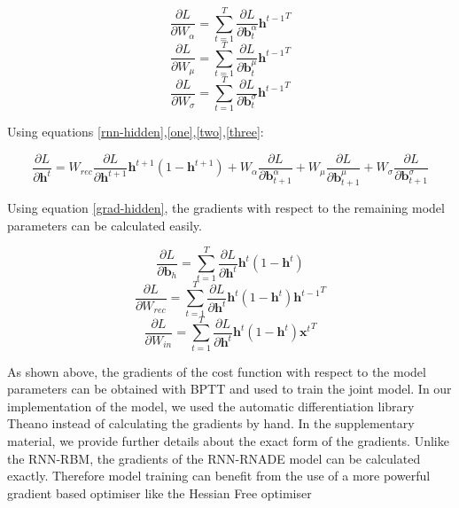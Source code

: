\documentclass{article} %
\begin{document}
\begin{equation}
\frac{\partial L}{\partial W_{\alpha}} = \sum_{t=1}^T \frac{\partial L}{\partial \mathbf{b}^{\alpha}_{t}} {\mathbf{h}^{t-1}}^{T}
\end{equation}
\begin{equation}
\frac{\partial L}{\partial W_{\mu}} = \sum_{t=1}^T \frac{\partial L}{\partial \mathbf{b}^{\mu}_{t}} {\mathbf{h}^{t-1}}^{T}
\end{equation}
\begin{equation}
\frac{\partial L}{\partial W_{\sigma}} = \sum_{t=1}^T \frac{\partial L}{\partial \mathbf{b}^{\sigma}_{t}} {\mathbf{h}^{t-1}}^{T}
\end{equation}

Using equations \ref{rnn-hidden},\ref{one},\ref{two},\ref{three}:

\begin{equation}
\label{grad-hidden}
\frac{\partial L}{\partial \mathbf{h}^t} = W_{rec}\frac{\partial L}{\partial \mathbf{h}^{t+1}} \mathbf{h}^{t+1} (1 - \mathbf{h}^{t+1}) + W_{\alpha} \frac{\partial L}{\partial \mathbf{b}^{\alpha}_{t+1}} + W_{\mu} \frac{\partial L}{\partial \mathbf{b}^{\mu}_{t+1}} + W_{\sigma} \frac{\partial L}{\partial \mathbf{b}^{\sigma}_{t+1}}
\end{equation}

Using equation \ref{grad-hidden}, the gradients with respect to the remaining model parameters can be calculated easily. 

$$ \frac{\partial L}{\partial \mathbf{b}_{h}} =  \sum_{t=1}^{T} \frac{\partial L}{\partial \mathbf{h}^t} \mathbf{h}^t (1 - \mathbf{h}^t)$$
$$ \frac{\partial L}{\partial W_{rec}} = \sum_{t=1}^{T} \frac{\partial L}{\partial \mathbf{h}^t} \mathbf{h}^t (1 - \mathbf{h}^t) {\mathbf{h}^{t-1}}^T$$
$$ \frac{\partial L}{\partial W_{in}} = \sum_{t=1}^{T} \frac{\partial L}{\partial \mathbf{h}^t} \mathbf{h}^t (1 - \mathbf{h}^t) {\mathbf{x}^{t}}^T$$

As shown above, the gradients of the cost function with respect to the model parameters can be obtained with BPTT and used to train the joint model. In our implementation of the model, we used the automatic differentiation library Theano \cite{bergstra+al:2010-scipy} instead of calculating the gradients by hand. In the supplementary material, we provide further details about the exact form of the gradients. Unlike the RNN-RBM, the gradients of the RNN-RNADE model can be calculated exactly. Therefore model training can benefit from the use of a more powerful gradient based optimiser like the Hessian Free optimiser \cite{Martens2011}
\end{document}
